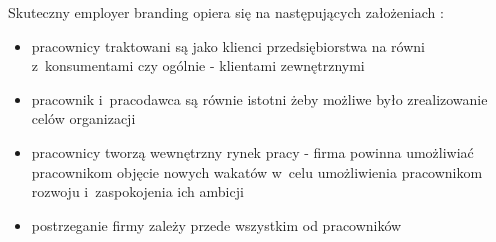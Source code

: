 Skuteczny employer branding opiera się na następujących założeniach \cite{spychala-2019}:
\begin{itemize}
    \item pracownicy traktowani są jako klienci przedsiębiorstwa na równi z~konsumentami czy ogólnie - klientami zewnętrznymi
    \item pracownik i~pracodawca są równie istotni żeby możliwe było zrealizowanie celów organizacji
    \item pracownicy tworzą wewnętrzny rynek pracy - firma powinna umożliwiać pracownikom objęcie nowych wakatów w~celu umożliwienia pracownikom rozwoju i~zaspokojenia ich ambicji
    \item postrzeganie firmy zależy przede wszystkim od pracowników
\end{itemize}

